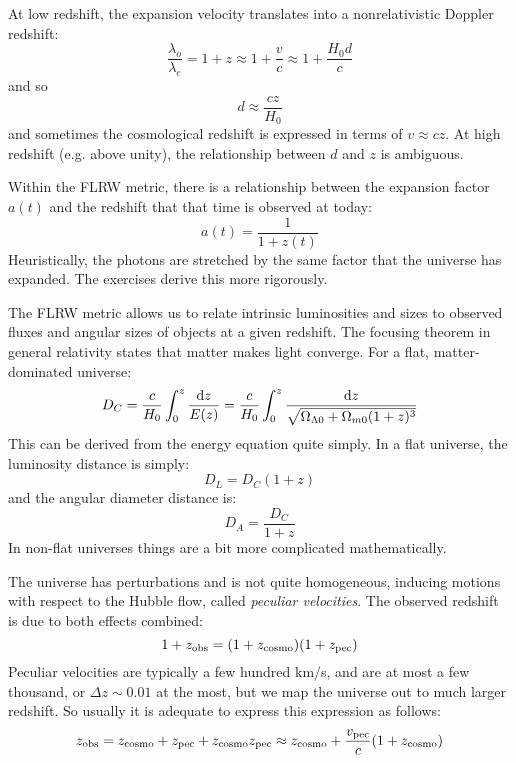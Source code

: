 At low redshift, the expansion velocity translates into a
nonrelativistic Doppler redshift:
\begin{equation} 
\frac{\lambda_o}{\lambda_e} = 1+z  \approx 1 + \frac{v}{c} \approx 1
+ \frac{H_0 d}{c}
\end{equation} 
and so
\begin{equation}
d \approx \frac{cz}{H_0}
\end{equation}
and sometimes the cosmological redshift is expressed in terms of
$v\approx cz$. At high redshift (e.g. above unity), the relationship
between $d$ and $z$ is ambiguous. 

Within the FLRW metric, there is a relationship between the expansion
factor $a(t)$ and the redshift that that time is observed at today:
\begin{equation}
a(t) = \frac{1}{1+z(t)}
\end{equation}
Heuristically, the photons are stretched by the same factor that the
universe has expanded. The exercises derive this more rigorously. 

The FLRW metric allows us to relate intrinsic luminosities and sizes
to observed fluxes and angular sizes of objects at a given
redshift. The focusing theorem in general relativity states that
matter makes light converge. For a flat, matter-dominated universe:
\begin{equation}
D_C= 
\frac{c}{H_0} \int_0^z \frac{{\rm d}z}{E(z)}
= 
\frac{c}{H_0} \int_0^z \frac{{\rm d}z}{\sqrt{\Omega_{\Lambda0} +
    \Omega_{m0}(1+z)^3}}
\end{equation}
This can be derived from the energy equation quite simply. In a flat
universe, the luminosity distance is simply:
\begin{equation}
D_L = D_C (1+z)
\end{equation}
and the angular diameter distance is:
\begin{equation}
D_A = \frac{D_C}{1+z}
\end{equation}
In non-flat universes things are a bit more complicated
mathematically.

The universe has perturbations and is not quite homogeneous, inducing
motions with respect to the Hubble flow, called {\it peculiar
velocities}.  The observed redshift is due to both effects combined:
\begin{equation}
1+z_{\rm obs} = (1+z_{\rm cosmo})(1+z_{\rm pec})
\end{equation}
Peculiar velocities are typically a few hundred km/s, and are at most
a few thousand, or $\Delta z \sim 0.01$ at the most, but we map the
universe out to much larger redshift. So usually it is adequate to
express this expression as follows:
\begin{equation}
z_{\rm obs} = z_{\rm cosmo}+z_{\rm pec} + z_{\rm cosmo}z_{\rm pec}
\approx z_{\rm cosmo} + \frac{v_{\rm pec}}{c} (1+z_{\rm cosmo})
\end{equation}


